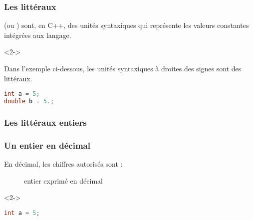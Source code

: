 \documentclass{cppcourses}
\begin{document}
\begin{frame}[fragile]

\frametitle{Les littéraux}

\begin{definition}
 (ou ) sont, en C++, des unités syntaxiques qui représente les valeurs constantes intégrées aux langage.
\end{definition}

\begin{example}<2->

Dans l'exemple ci-dessous, les unités syntaxiques à droites des signes \myimp{\mykeyword{=}} sont des littéraux.

\begin{lstlisting}[language = c++]
int a = 5;
double b = 5.;
\end{lstlisting}

\end{example}

\end{frame}

\subsubsection{Les littéraux entiers}

\begin{frame}[fragile]

\frametitle{Un entier en décimal}

En décimal, les chiffres autorisés sont  :

\begin{figure}
\mykeyword{\textcolor{red}{<chiffres>}\textcolor{orange}{[suffixe]}}
\caption{entier exprimé en décimal}
\end{figure}

\begin{example}<2->

\begin{lstlisting}[language = c++]
int a = 5;
\end{lstlisting}

\end{example}

\end{frame}
\end{document}
